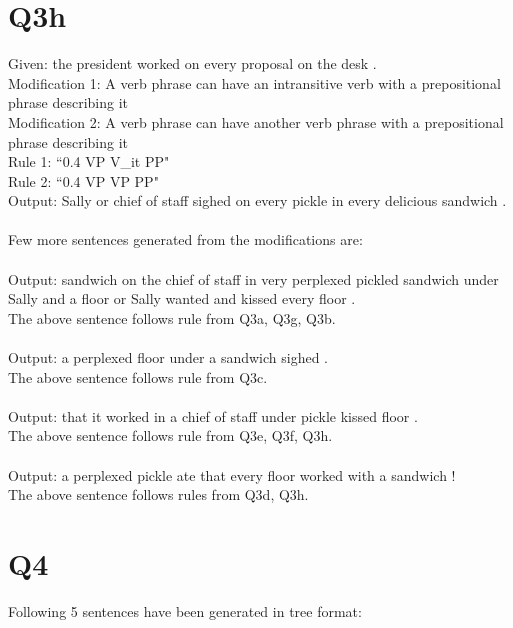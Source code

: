 \documentclass[12pt]{article}
\begin{document}
\section*{Q3h}
Given: the president worked on every proposal on the desk .\\
Modification 1: A verb phrase can have an intransitive verb with a prepositional phrase describing it\\
Modification 2: A verb phrase can have another verb phrase with a prepositional phrase describing it\\
Rule 1: ``0.4\hspace{1cm}	VP\hspace{1cm}	V\_it PP"\\
Rule 2: ``0.4\hspace{1cm}	VP\hspace{1cm}	VP PP"\\
Output: Sally  or  chief  of  staff  sighed  on  every  pickle  in  every  delicious  sandwich  .\\
\\
Few more sentences generated from the modifications are:\\
\\
Output: sandwich  on  the  chief  of  staff  in  very  perplexed  pickled  sandwich  under  Sally  and  a  floor  or  Sally  wanted  and  kissed  every  floor  . 
\\
The above sentence follows rule from Q3a, Q3g, Q3b.\\
\\
Output: a  perplexed  floor  under  a  sandwich  sighed  .
\\
The above sentence follows rule from Q3c.\\
\\
Output: that  it  worked  in  a  chief  of  staff  under  pickle  kissed  floor  . 
\\
The above sentence follows rule from Q3e, Q3f, Q3h.\\
\\
Output: a  perplexed  pickle  ate  that  every  floor  worked  with  a  sandwich  ! 
\\
The above sentence follows rules from Q3d, Q3h.\\
\pagebreak
\section*{Q4}
Following 5 sentences have been generated in tree format:\\
\pagebreak
\end{document}
